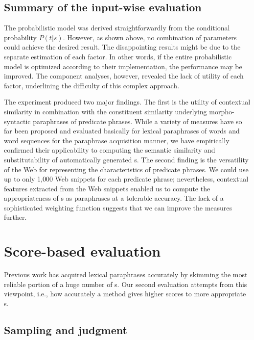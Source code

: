 \documentclass[english]{jnlp_1.4}
\begin{document}
\subsection{Summary of the input-wise evaluation}
\label{ssec:summary1}

The probabilistic model was derived straightforwardly from the
conditional probability $P(t|s)$.  However, as shown above, no
combination of parameters could achieve the desired result.
The disappointing results might be due to the separate estimation of
each factor.  In other words, if the entire probabilistic model is
optimized according to their implementation, the performance may be
improved.
The component analyses, however, revealed the lack of utility of each
factor, underlining the difficulty of this complex approach.

The experiment produced two major findings.
The first is the utility of contextual similarity in combination with
the constituent similarity underlying morpho-syntactic paraphrases of
predicate phrases.  While a variety of measures have so far been
proposed and evaluated basically for lexical paraphrases of words and
word sequences for the paraphrase acquisition manner, we have
empirically confirmed their applicability to computing the semantic
similarity and substitutability of automatically generated {\pcp}s.
The second finding is the versatility of the Web for representing the
characteristics of predicate phrases.  We could use up to only 1,000
Web snippets for each predicate phrase; nevertheless, contextual
features extracted from the Web snippets enabled us to compute the
appropriateness of {\pcp}s as paraphrases at a tolerable accuracy.
The lack of a sophisticated weighting function suggests that we can
improve the measures further.




\section{Score-based evaluation}
\label{sec:eval-rec}

Previous work has acquired lexical paraphrases accurately by skimming
the most reliable portion of a huge number of {\pc}s.  Our second
evaluation attempts from this viewpoint, i.e., how accurately a method
gives higher scores to more appropriate {\pcp}s.

\subsection{Sampling and judgment}
\label{ssec:rec-sampling}
\end{document}
